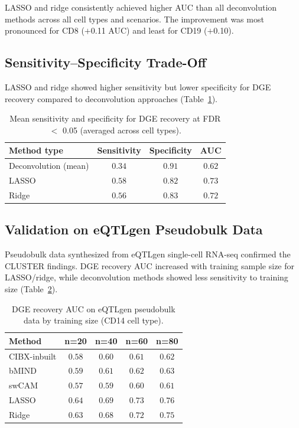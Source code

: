 \documentclass[11pt]{article}
\begin{document}
LASSO and ridge consistently achieved higher AUC than all deconvolution methods across all cell types and scenarios. The improvement was most pronounced for CD8 ($+$0.11 AUC) and least for CD19 ($+$0.10).

\subsection{Sensitivity--Specificity Trade-Off}

LASSO and ridge showed higher sensitivity but lower specificity for DGE recovery compared to deconvolution approaches (Table~\ref{tab:sensspec}).

\begin{table}[H]
\centering
\caption{Mean sensitivity and specificity for DGE recovery at FDR $<$ 0.05 (averaged across cell types).}
\label{tab:sensspec}
\begin{tabular}{lccc}
\toprule
\textbf{Method type} & \textbf{Sensitivity} & \textbf{Specificity} & \textbf{AUC} \\
\midrule
Deconvolution (mean) & $0.34$ & $\mathbf{0.91}$ & $0.62$ \\
LASSO & $\mathbf{0.58}$ & $0.82$ & $\mathbf{0.73}$ \\
Ridge & $0.56$ & $0.83$ & $0.72$ \\
\bottomrule
\end{tabular}
\end{table}

\subsection{Validation on eQTLgen Pseudobulk Data}

Pseudobulk data synthesized from eQTLgen single-cell RNA-seq \citep{vosa2021eqtlgen} confirmed the CLUSTER findings. DGE recovery AUC increased with training sample size for LASSO/ridge, while deconvolution methods showed less sensitivity to training size (Table~\ref{tab:pseudobulk}).

\begin{table}[H]
\centering
\caption{DGE recovery AUC on eQTLgen pseudobulk data by training size (CD14 cell type).}
\label{tab:pseudobulk}
\begin{tabular}{lcccc}
\toprule
\textbf{Method} & \textbf{n=20} & \textbf{n=40} & \textbf{n=60} & \textbf{n=80} \\
\midrule
CIBX-inbuilt & $0.58$ & $0.60$ & $0.61$ & $0.62$ \\
bMIND & $0.59$ & $0.61$ & $0.62$ & $0.63$ \\
swCAM & $0.57$ & $0.59$ & $0.60$ & $0.61$ \\
LASSO & $0.64$ & $0.69$ & $0.73$ & $\mathbf{0.76}$ \\
Ridge & $0.63$ & $0.68$ & $0.72$ & $0.75$ \\
\bottomrule
\end{tabular}
\end{table}
\end{document}
